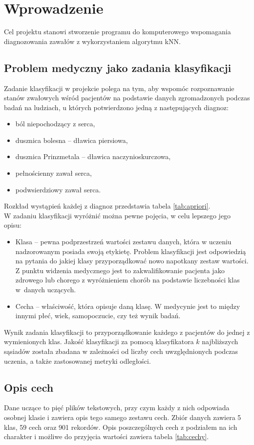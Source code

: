 \section{Wprowadzenie}
Cel projektu stanowi stworzenie programu do komputerowego wspomagania diagnozowania zawałów z wykorzystaniem algorytmu kNN.

\subsection{Problem medyczny jako zadania klasyfikacji}
Zadanie klasyfikacji w projekcie polega na tym, aby wspomóc rozpoznawanie stanów zwałowych wśród pacjentów na podstawie danych zgromadzonych podczas badań na ludziach, u których potwierdzono jedną z następujących diagnoz:

\begin{itemize}
    \item ból niepochodzący z serca,
    \item dusznica bolesna – dławica piersiowa,
    \item dusznica Prinzmetala – dławica naczynioskurczowa,
    \item pełnościenny zawał serca,
    \item podwsierdziowy zawał serca.
\end{itemize}
Rozkład wystąpień każdej z diagnoz przedstawia tabela \ref{tab:apriori}.
\\

W zadaniu klasyfikacji wyróżnić można pewne pojęcia, w celu lepszego jego opisu:

\begin{itemize}
    \item Klasa – pewna podprzestrzeń wartości zestawu danych, która w uczeniu nadzorowanym posiada swoją etykietę. Problem klasyfikacji jest odpowiedzią na pytania do jakiej klasy przyporządkować nowo napotkany zestaw wartości. Z punktu widzenia medycznego jest to zakwalifikowanie pacjenta jako zdrowego lub chorego z wyróżnieniem chorób na podstawie liczebności klas w~danych uczących.

    \item Cecha – właściwość, która opisuje daną klasę. W medycynie jest to między innymi płeć, wiek, samopoczucie, czy też wynik badań.
\end{itemize}

Wynik zadania klasyfikacji to przyporządkowanie każdego z pacjentów do jednej z wymienionych klas. Jakość klasyfikacji za pomocą klasyfikatora $k$ najbliższych sąsiadów została zbadana w zależności od liczby cech uwzględnionych podczas uczenia, a także zastosowanej metryki odległości.

\subsection{Opis cech}
Dane uczące to pięć plików tekstowych, przy czym każdy z nich odpowiada osobnej klasie i zawiera opis tego samego zestawu cech. Zbiór danych zawiera 5 klas, 59 cech oraz 901 rekordów. Opis poszczególnych cech z podziałem na ich charakter i możliwe do przyjęcia wartości zawiera tabela \ref{tab:cechy}.



